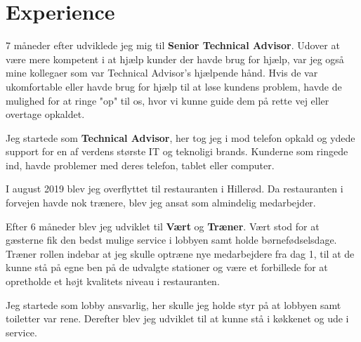 \documentclass[]{plushcv}
\begin{document}
%
%


%
%

\begin{minipage}[t]{0.70\textwidth} 



\section{Experience}
\vspace{\topsep} %
\begin{tightemize}
\sectionsep
\item 7 måneder efter udviklede jeg mig til \textbf{Senior Technical Advisor}. Udover at være mere kompetent i at hjælp kunder der havde brug for hjælp, var jeg også mine kollegaer som var Technical Advisor's hjælpende hånd. Hvis de var ukomfortable eller havde brug for hjælp til at løse kundens problem, havde de mulighed for at ringe "op" til os, hvor vi kunne guide dem på rette vej eller overtage opkaldet.
\item Jeg startede som \textbf{Technical Advisor}, her tog jeg i mod telefon opkald og ydede support for en af verdens største IT og teknoligi brands. Kunderne som ringede ind, havde problemer med deres telefon, tablet eller computer.
\end{tightemize}
\sectionsep

\begin{tightemize}
\sectionsep
\item I august 2019 blev jeg overflyttet til restauranten i Hillerød. Da restauranten i forvejen havde nok trænere, blev jeg ansat som almindelig medarbejder.
\item Efter 6 måneder blev jeg udviklet til \textbf{Vært} og \textbf{Træner}. Vært stod for at gæsterne fik den bedst mulige service i lobbyen samt holde børnefødselsdage. Træner rollen indebar at jeg skulle optræne nye medarbejdere fra dag 1, til at de kunne stå på egne ben på de udvalgte stationer og være et forbillede for at opretholde et højt kvalitets niveau i restauranten.
\item Jeg startede som lobby ansvarlig, her skulle jeg holde styr på at lobbyen samt toiletter var rene. Derefter blev jeg udviklet til at kunne stå i køkkenet og ude i service.
\end{tightemize}
\sectionsep



\end{minipage}
\end{document}
